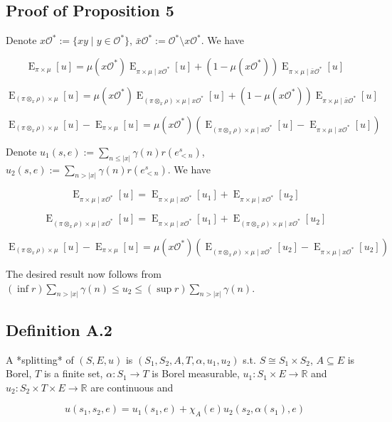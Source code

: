 \documentclass[a4paper]{article}
\DeclareMathOperator{\E}{E}
\newcommand{\Reals}{\mathbb{R}}
\newcommand{\Abs}[1]{\lvert #1 \rvert}
\newcommand{\Obs}{\mathcal{O}}
\begin{document}
\subsection{Proof of Proposition 5}

Denote ${x\Obs^*:=\{xy \mid y \in \Obs^*\}}$, $\bar{x}\Obs^*:=\Obs^* \setminus x\Obs^*$. We have

$$\E_{\pi \times \mu}[u] = \mu(x\Obs^*) \E_{\pi \times \mu \mid x \Obs^*}[u] + (1 - \mu(x\Obs^*)) \E_{\pi \times \mu \mid \bar{x} \Obs^*}[u]$$

$$\E_{(\pi \otimes_x \rho) \times \mu}[u] = \mu(x\Obs^*) \E_{(\pi \otimes_x \rho) \times \mu \mid x \Obs^*}[u] + (1 - \mu(x\Obs^*)) \E_{\pi \times \mu \mid \bar{x} \Obs^*}[u]$$

$$\E_{(\pi \otimes_x \rho) \times \mu}[u]-\E_{\pi \times \mu}[u] = \mu(x\Obs^*)(\E_{(\pi \otimes_x \rho) \times \mu \mid x \Obs^*}[u]-\E_{\pi \times \mu \mid x \Obs^*}[u])$$

Denote ${u_1(s,e):=\sum_{n \leq \Abs{x}} \gamma(n) r(e^s_{<n})}$, ${u_2(s,e):=\sum_{n > \Abs{x}} \gamma(n) r(e^s_{<n})}$. We have

$$\E_{\pi \times \mu \mid x \Obs^*}[u] = \E_{\pi \times \mu \mid x \Obs^*}[u_1] + \E_{\pi \times \mu \mid x \Obs^*}[u_2]$$

$$\E_{(\pi \otimes_x \rho) \times \mu \mid x \Obs^*}[u] = \E_{\pi \times \mu \mid x \Obs^*}[u_1] + \E_{(\pi \otimes_x \rho) \times \mu \mid x \Obs^*}[u_2]$$

$$\E_{(\pi \otimes_x \rho) \times \mu}[u]-\E_{\pi \times \mu}[u] = \mu(x\Obs^*)(\E_{(\pi \otimes_x \rho) \times \mu \mid x \Obs^*}[u_2]-\E_{\pi \times \mu \mid x \Obs^*}[u_2])$$

The desired result now follows from ${(\inf r) \sum_{n > \Abs{x}} \gamma(n) \leq u_2 \leq (\sup r) \sum_{n > \Abs{x}} \gamma(n)}$.

\subsection{Definition A.2}

A *splitting* of ${(S,E,u)}$ is ${(S_1,S_2,A,T,\alpha,u_1,u_2)}$ s.t. ${S \cong S_1 \times S_2}$, ${A \subseteq E}$ is Borel, ${T}$ is a finite set, ${\alpha: S_1 \rightarrow T}$ is Borel measurable, ${u_1: S_1 \times E \rightarrow \Reals}$ and ${u_2: S_2 \times T \times E \rightarrow \Reals}$ are continuous and

$$u(s_1,s_2,e) = u_1(s_1,e) + \chi_A(e) u_2(s_2, \alpha(s_1), e)$$
\end{document}
